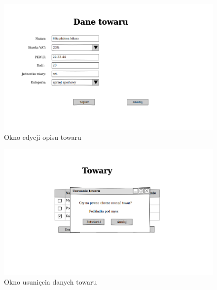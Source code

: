 \begin{figure}[!htb]
  \begin{center}
    \includegraphics[scale=0.45]{../img/interfejs/edycja-danych-towaru.png}
  \end{center}
  \caption{Okno edycji opisu towaru}
\end{figure}
\FloatBarrier

\begin{figure}[!htb]
  \begin{center}
    \includegraphics[scale=0.45]{../img/interfejs/usuniecie-danych-towaru.png}
  \end{center}
  \caption{Okno usunięcia danych towaru}
\end{figure}
\FloatBarrier

